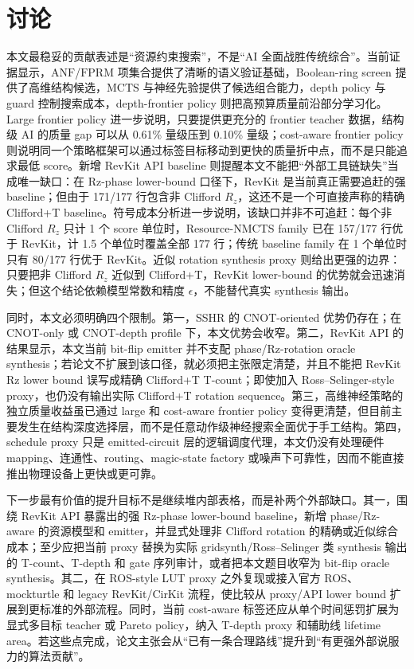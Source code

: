 \documentclass[UTF8,fontset=macnew,11pt]{ctexart}
\newcommand{\screen}{Boolean-ring screen}
\newcommand{\anf}{\ensuremath{\mathrm{ANF}}}
\newcommand{\fprm}{\ensuremath{\mathrm{FPRM}}}
\newcommand{\mcts}{\ensuremath{\mathrm{MCTS}}}
\begin{document}
\section{讨论}

本文最稳妥的贡献表述是“资源约束搜索”，不是“AI 全面战胜传统综合”。当前证据显示，\anf{}/\fprm{} 项集合提供了清晰的语义验证基础，\screen{} 提供了高维结构候选，\mcts{} 与神经先验提供了候选组合能力，depth policy 与 guard 控制搜索成本，depth-frontier policy 则把高预算质量前沿部分学习化。Large frontier policy 进一步说明，只要提供更充分的 frontier teacher 数据，结构级 AI 的质量 gap 可以从 0.61\% 量级压到 0.10\% 量级；cost-aware frontier policy 则说明同一个策略框架可以通过标签目标移动到更快的质量折中点，而不是只能追求最低 score。新增 RevKit API baseline 则提醒本文不能把“外部工具链缺失”当成唯一缺口：在 Rz-phase lower-bound 口径下，RevKit 是当前真正需要追赶的强 baseline；但由于 171/177 行包含非 Clifford $R_z$，这还不是一个可直接声称的精确 Clifford+T baseline。符号成本分析进一步说明，该缺口并非不可追赶：每个非 Clifford $R_z$ 只计 1 个 score 单位时，Resource-NMCTS family 已在 157/177 行优于 RevKit，计 1.5 个单位时覆盖全部 177 行；传统 baseline family 在 1 个单位时只有 80/177 行优于 RevKit。近似 rotation synthesis proxy 则给出更强的边界：只要把非 Clifford $R_z$ 近似到 Clifford+T，RevKit lower-bound 的优势就会迅速消失；但这个结论依赖模型常数和精度 $\epsilon$，不能替代真实 synthesis 输出。

同时，本文必须明确四个限制。第一，SSHR 的 CNOT-oriented 优势仍存在；在 CNOT-only 或 CNOT-depth profile 下，本文优势会收窄。第二，RevKit API 的结果显示，本文当前 bit-flip emitter 并不支配 phase/Rz-rotation oracle synthesis；若论文不扩展到该口径，就必须把主张限定清楚，并且不能把 RevKit Rz lower bound 误写成精确 Clifford+T T-count；即使加入 Ross--Selinger-style proxy，也仍没有输出实际 Clifford+T rotation sequence。第三，高维神经策略的独立质量收益虽已通过 large 和 cost-aware frontier policy 变得更清楚，但目前主要发生在结构深度选择层，而不是任意动作级神经搜索全面优于手工结构。第四，schedule proxy 只是 emitted-circuit 层的逻辑调度代理，本文仍没有处理硬件 mapping、连通性、routing、magic-state factory 或噪声下可靠性，因而不能直接推出物理设备上更快或更可靠。

下一步最有价值的提升目标不是继续堆内部表格，而是补两个外部缺口。其一，围绕 RevKit API 暴露出的强 Rz-phase lower-bound baseline，新增 phase/Rz-aware 的资源模型和 emitter，并显式处理非 Clifford rotation 的精确或近似综合成本；至少应把当前 proxy 替换为实际 gridsynth/Ross--Selinger 类 synthesis 输出的 T-count、T-depth 和 gate 序列审计，或者把本文题目收窄为 bit-flip oracle synthesis。其二，在 ROS-style LUT proxy 之外复现或接入官方 ROS、mockturtle 和 legacy RevKit/CirKit 流程，使比较从 proxy/API lower bound 扩展到更标准的外部流程。同时，当前 cost-aware 标签还应从单个时间惩罚扩展为显式多目标 teacher 或 Pareto policy，纳入 T-depth proxy 和辅助线 lifetime area。若这些点完成，论文主张会从“已有一条合理路线”提升到“有更强外部说服力的算法贡献”。
\end{document}
